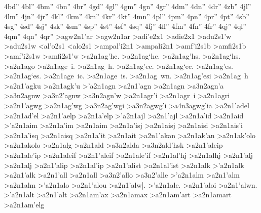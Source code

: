 {4bd''
4bl''
4bm''
4bn''
4br''
%
4gd''
4gl''
4gm''
4gn''
4gr''
%
4dm''
4dn''
4dr''
%
4zb''
%
4jl''
4lm''
4jn''
4jr''
%
4kl''
4km''
4kn''
4kr''
4kt''
%
4mn''
%
4pl''
4pm''
4pn''
4pr''
4pt''
%
4sb''
4sg''
4sd''
4sj''
4sk''
4sm''
4sp''
4st''
4sf''
4sq''
%
4fj''
4fl''
4fm''
4fn''
4fr''
%
4qj''
4ql''
4qm''
4qn''
4qr''
%
>agw2n1'ar  %
>agw2n1ar
>adi'e2x1 		%
>adie2x1
>adu2s1'w 		%
>adu2s1w
<al'o2s1    		%
<alo2s1
>ampal'i2n1 		%
>ampali2n1
>amf'i2s1b 		%
>amfi2s1b
>amf'i2s1w 		%
>amfi2s1'w
>a2n1ag'hc. 		%
>a2n1ag`hc.
>a2n1ag'hs.
>a2n1ag`hs.
>a2n1ago
>a2n1age~i.
>a2n1ag~h.
>a2n1ag'ec.
>a2n1ag`ec.
>a2n1ag'es.
>a2n1ag`es.
>a2n1age~ic.
>a2n1age~is.
>a2n1ag~wn.
>a2n1ag'esi
>a2n1ag~h
>a2n1'agku 		%
>a2n1agk'u
>'a2n1agn  		%
>a2n1'agn
>a2n1agn   		%
	>a3n2agn'a 		%
	>a3n2agnw  		%
	>a3n2'agnw 		%
	>a3n2agn'w
>a2n1agr'i 		%
>a2n1agr~i 		%
>a2n1agri   		%
>a2n1'agwg 		%
>a2n1ag'wg
	>a3n2ag'wgi   		%
	>a3n2agwg'i
		>a4n3agwg'ia 		%
>a2n1'adel 		%
>a2n1ad'el
>a2n1'aelp  		%
>a2n1a'elp
>'a2n1ajl  		%
>a2n1'ajl
>a2n1a'id  		%
>a2n1aid   		%
>'a2n1aim  		%
>a2n1a'im
>a2n1aim   		%
>a2n1a'isj 		%
>a2n1aisj
>a2n1aisi  		%
>a2n1ais'i
>a2n1a'isq  		%
>a2n1aisq
>a2n1a'it 		%
>a2n1ait
>a2n1'akan 		%
>a2n1ak'an
>a2n1ak'olo 		%
>a2n1akolo
>a2n1alg  		%
>a2n1ald  		%
	>a3n2alda 		%
	>a3n2ald'hsk 		%
>a2n1'aleip		%
>a2n1ale'ip
>a2n1aleif 		%
>a2n1'aleif 		%
>a2n1ale'if
>a2n1al'hj 		%
>a2n1alhj
>a2n1'alj 		%
>a2n1alj
>a2n1'alip 		%
>a2n1al'ip
>a2n1'alist 		%
>a2n1al'ist
>a2n1alk  		%
>'a2n1alk 		%
>a2n1'alk
>a2n1'all     		%
>a2n1all
	>a3n2'allo 		%
	>a3n2'alle
>'a2n1alm 		%
>a2n1'alm 		%
>a2n1alm
>'a2n1alo 		%
>a2n1'alou
>a2n1'alw|.
>'a2n1ale.
>a2n1'aloi
>a2n1'alwn.
>'a2n1alt 		%
>a2n1'alt
>a2n1am'ax 		%
>a2n1amax
>a2n1am'art 		%
>a2n1amart
>a2n1am'elg 		%
}
